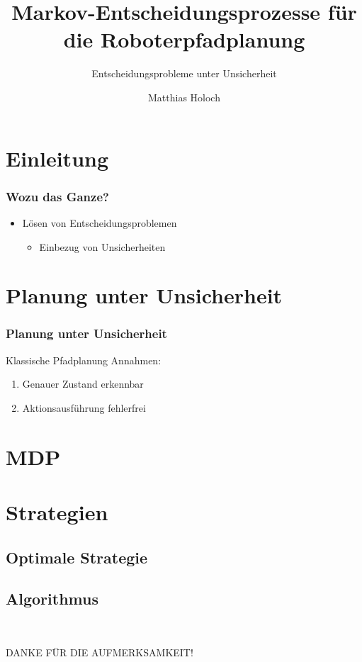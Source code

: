 \documentclass[18pt]{beamer}
\title[MDP Pfadplanung]{Markov-Entscheidungsprozesse für die Roboterpfadplanung}
\subtitle{Entscheidungsprobleme unter Unsicherheit} %
\author{Matthias Holoch}
\institute{Proseminar Anthropomatik: Von der Theorie zur Anwendung}
\begin{document}

\begin{frame}
	\titlepage
\end{frame}


\section{Einleitung}
\begin{frame}
	\frametitle{Wozu das Ganze?}
	\begin{itemize}
		\item Lösen von Entscheidungsproblemen 
		\begin{itemize}
			\item Einbezug von Unsicherheiten
		\end{itemize}
	\end{itemize}
\end{frame}

\section{Planung unter Unsicherheit}
\begin{frame}
	\frametitle{Planung unter Unsicherheit}
	\begin{block}{Klassische Pfadplanung}
		Annahmen:
		\begin{enumerate}
		\item Genauer Zustand erkennbar
		\item Aktionsausführung fehlerfrei
		\end{enumerate}
	\end{block}
\end{frame}

\section{MDP}

\section{Strategien}
\subsection{Optimale Strategie}
\subsection{Algorithmus}

\begin{frame}{~}
	\begin{center}
		\huge{DANKE FÜR DIE AUFMERKSAMKEIT!}
	\end{center}
\end{frame}
\end{document}
